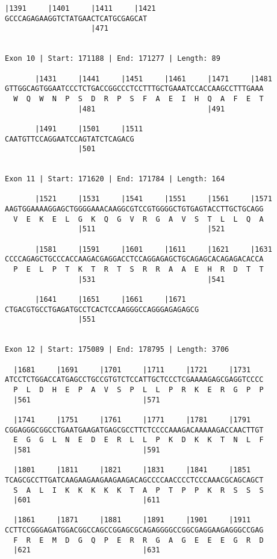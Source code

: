 \documentclass{article}
\begin{document}
\begin{Verbatim}
|1391     |1401     |1411     |1421
GCCCAGAGAAGGTCTATGAACTCATGCGAGCAT
                    |471         
  
 
Exon 10 | Start: 171188 | End: 171277 | Length: 89
 
       |1431     |1441     |1451     |1461     |1471     |1481
GTTGGCAGTGGAATCCCTCTGACCGGCCCTCCTTTGCTGAAATCCACCAAGCCTTTGAAA
  W  Q  W  N  P  S  D  R  P  S  F  A  E  I  H  Q  A  F  E  T
                 |481                          |491         
  
       |1491     |1501     |1511
CAATGTTCCAGGAATCCAGTATCTCAGACG
                 |501         
  
 
Exon 11 | Start: 171620 | End: 171784 | Length: 164
 
       |1521     |1531     |1541     |1551     |1561     |1571
AAGTGGAAAAGGAGCTGGGGAAACAAGGCGTCCGTGGGGCTGTGAGTACCTTGCTGCAGG
  V  E  K  E  L  G  K  Q  G  V  R  G  A  V  S  T  L  L  Q  A
                 |511                          |521         
  
       |1581     |1591     |1601     |1611     |1621     |1631
CCCCAGAGCTGCCCACCAAGACGAGGACCTCCAGGAGAGCTGCAGAGCACAGAGACACCA
  P  E  L  P  T  K  T  R  T  S  R  R  A  A  E  H  R  D  T  T
                 |531                          |541         
  
       |1641     |1651     |1661     |1671   
CTGACGTGCCTGAGATGCCTCACTCCAAGGGCCAGGGAGAGAGCG
                 |551                        
  
 
Exon 12 | Start: 175089 | End: 178795 | Length: 3706
 
  |1681     |1691     |1701     |1711     |1721     |1731   
ATCCTCTGGACCATGAGCCTGCCGTGTCTCCATTGCTCCCTCGAAAAGAGCGAGGTCCCC
  P  L  D  H  E  P  A  V  S  P  L  L  P  R  K  E  R  G  P  P
  |561                          |571                        
  
  |1741     |1751     |1761     |1771     |1781     |1791   
CGGAGGGCGGCCTGAATGAAGATGAGCGCCTTCTCCCCAAAGACAAAAAGACCAACTTGT
  E  G  G  L  N  E  D  E  R  L  L  P  K  D  K  K  T  N  L  F
  |581                          |591                        
  
  |1801     |1811     |1821     |1831     |1841     |1851   
TCAGCGCCTTGATCAAGAAGAAGAAGAAGACAGCCCCAACCCCTCCCAAACGCAGCAGCT
  S  A  L  I  K  K  K  K  K  T  A  P  T  P  P  K  R  S  S  S
  |601                          |611                        
  
  |1861     |1871     |1881     |1891     |1901     |1911   
CCTTCCGGGAGATGGACGGCCAGCCGGAGCGCAGAGGGGCCGGCGAGGAAGAGGGCCGAG
  F  R  E  M  D  G  Q  P  E  R  R  G  A  G  E  E  E  G  R  D
  |621                          |631                        
  

\end{Verbatim}
\end{document}
